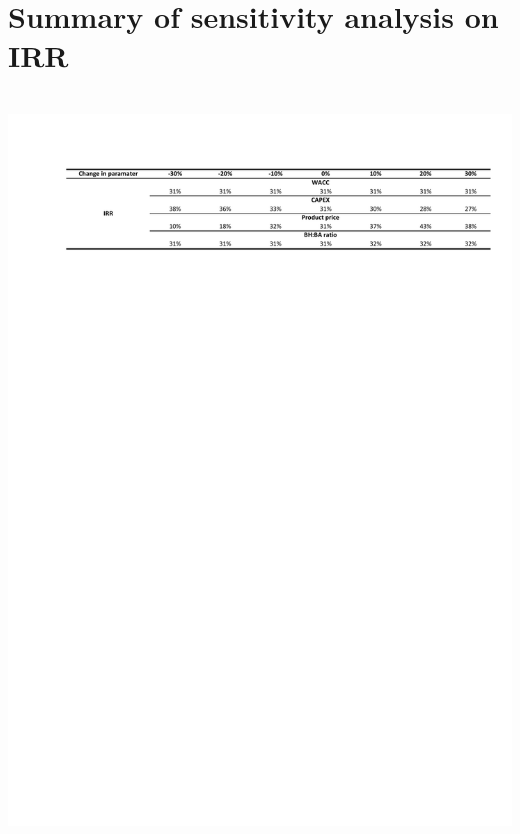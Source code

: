 \section{Summary of sensitivity analysis on IRR}
\label{app:irr-sensitivity}

\begin{table}[H]
    \centering
    \
    \includegraphics[clip, trim = 1cm 15cm 1cm 1cm, width=\linewidth]{chapters/6-economics/figures/sensitivity1.pdf}
    \label{tab:irr-sensitivity}
\end{table}

